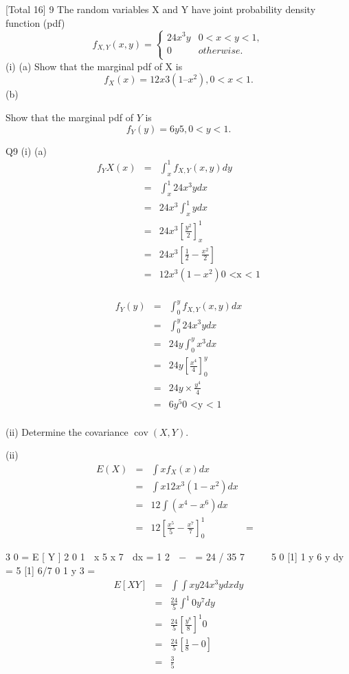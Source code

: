 \documentclass[a4paper,12pt]{article}
\begin{document}
[Total 16]
9
The random variables X and Y have joint probability density function (pdf)
\[
f_{X,Y}(x,y) = \begin{cases}  
24 x^3 y & 0 < x < y < 1, \\
0 & otherwise.\\
\end{cases}
\]
(i)
(a)
Show that the marginal pdf of X is
\[f_X(x) = 12x 3 (1 – x^2 ), 0 < x < 1.\]
(b)
\newpage

Show that the marginal pdf of $Y$ is 
\[f_Y   (y) = 6y 5 , 0 < y < 1.\]

Q9
(i)
(a)
\begin{eqnarray*}
f_YX(x) 
&=& \int^{1}_{x} f_{X,Y}(x,y) dy \\
&=& \int^{1}_{x} 24x^3 y dx \\
&=& 24x^3 \int^{1}_{x}y dx \\
&=& 24x^3 \left[ \frac{y^2}{2} \right]^{1}_{x}\\
&=& 24x^3 \left[ \frac{1}{2} - \frac{x^2}{2}\right] \\
&=& 12x^3(1-x^2)  \mbox{0 <x < 1} \\
\end{eqnarray*}

\begin{eqnarray*}
f_Y (y) 
&=& \int^{y}_{0} f_{X,Y}(x,y) dx \\
&=& \int^{y}_{0} 24x^3 y dx \\
&=& 24y \int^{y}_{0}x^3 dx \\
&=& 24y \left[ \frac{x^4}{4}\right]^{y}_{0}\\
&=& 24y \times \frac{y^4}{4}\\
&=& 6y^5 \mbox{0 <y < 1} \\
\end{eqnarray*}


(ii) Determine the covariance $\operatorname{cov}(X, Y)$.

(ii)
\begin{eqnarray*}
E(X) &=& \int x f_X ( x ) dx \\
&=& \int x 12 x^3 ( 1 − x^2 ) dx \\
&=&  12 \int ( x^4 - x^6 ) dx \\
&=& 12 \left[ \frac{x^5}{5} - \frac{x^7}{7} \right]^{1}_{0}
&=&
\end{eqnarray*}


3
0
=
E [ Y ]
2
0
1
 x 5 x 7 
dx =
  1
2  −  = 24 / 35    
7  
  5
0
[1]
1
y 6  
y dy
\int =
5
[1]
6/7
0
1 y
3
=
\begin{eqnarray*}
E [ XY ]   &=&
\int\int xy 24x^3 y dx dy \\ 
&=& \frac{24}{5} \int^{1}{0} y^7 dy \\
&=& \frac{24}{5} \left[ \frac{y^8}{8} \right]^{1}{0}\\
&=& \frac{24}{5} \left[ \frac{1}{8} - 0 \right]\\
&=& \frac{3}{5}
\end{eqnarray*}
\end{document}
